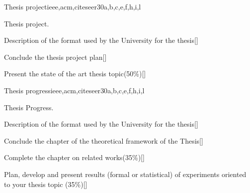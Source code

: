 \begin{syllabus}
\begin{unit}{Thesis project}{}{ieee,acm,citeseer}{30}{a,b,c,e,f,h,i,l}
   \begin{topics}
      \item Thesis project.	
   \end{topics}
   \begin{learningoutcomes}
      \item Description of the format used by the University for the thesis[\Assessment]
      \item Conclude the thesis project plan[\Assessment]
      \item Present the state of the art thesis topic(50\%)[\Assessment]
   \end{learningoutcomes}
\end{unit}

\begin{unit}{Thesis progress}{}{ieee,acm,citeseer}{30}{a,b,c,e,f,h,i,l}
   \begin{topics}
      \item Thesis Progress.
   \end{topics}
   \begin{learningoutcomes}
      \item Description of the format used by the University for the thesis[\Assessment]
      \item Conclude the chapter of the theoretical framework of the Thesis[\Assessment]
      \item Complete the chapter on related works(35\%)[\Assessment]
      \item Plan, develop and present results (formal or statistical) of experiments oriented to your thesis topic (35\%)[\Assessment]
   \end{learningoutcomes}
\end{unit}

\begin{coursebibliography}
\end{coursebibliography}
\end{syllabus}
